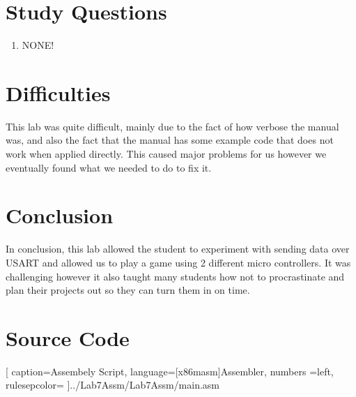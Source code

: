 \documentclass[12pt,letterpaper]{article}
\begin{document}
\section{Study Questions}
\begin{enumerate}
   \item NONE!
    
       
    
\end{enumerate}

\section{Difficulties}
This lab was quite difficult, mainly due to the fact of how verbose the manual was, and also the fact that the manual has some example code that does not work when applied directly. This caused major problems for us however we eventually found what we needed to do to fix it.

\section{Conclusion}
In conclusion, this lab allowed the student to experiment with sending data over USART and allowed us to play a game using 2 different micro controllers. It was challenging however it also taught many students how not to procrastinate and plan their projects out so they can turn them in on time.

\pagebreak

\section{Source Code}%

[
caption=Assembely Script,
language={[x86masm]Assembler},
numbers =left,
rulesepcolor=\color{blue}
]{../Lab7Assm/Lab7Assm/main.asm}
\end{document}
